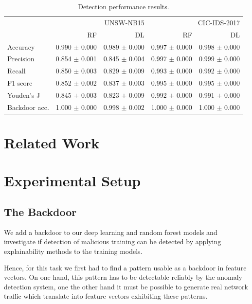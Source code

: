 \documentclass[10pt,sigconf,letterpaper,dvipsnames]{acmart}
\begin{document}
\begin{table}[h]
\caption{Detection performance results.} \label{tab:performance_results}
\begin{tabular}{l r r r r} \toprule
& \multicolumn{2}{r}{UNSW-NB15} & \multicolumn{2}{r}{CIC-IDS-2017} \\
& RF & DL & RF & DL \\ \midrule
Accuracy	& 0.990 $\pm$ 0.000	& 0.989 $\pm$ 0.000	& 0.997 $\pm$ 0.000	& 0.998 $\pm$ 0.000	\\
Precision	& 0.854 $\pm$ 0.001	& 0.845 $\pm$ 0.004	& 0.997 $\pm$ 0.000	& 0.999 $\pm$ 0.000	\\
Recall	& 0.850 $\pm$ 0.003	& 0.829 $\pm$ 0.009	& 0.993 $\pm$ 0.000	& 0.992 $\pm$ 0.000	\\
F1 score	& 0.852 $\pm$ 0.002	& 0.837 $\pm$ 0.003	& 0.995 $\pm$ 0.000	& 0.995 $\pm$ 0.000	\\
Youden's J	& 0.845 $\pm$ 0.003	& 0.823 $\pm$ 0.009	& 0.992 $\pm$ 0.000	& 0.991 $\pm$ 0.000	\\
Backdoor acc.	& 1.000 $\pm$ 0.000	& 0.998 $\pm$ 0.002	& 1.000 $\pm$ 0.000	& 1.000 $\pm$ 0.000	\\


\bottomrule
\end{tabular}
\end{table}

\section{Related Work}

\section{Experimental Setup} \label{sec:ml_approaches}
\subsection{The Backdoor}

We add a backdoor to our deep learning and random forest models and investigate if detection of malicious training can be detected by applying explainability methods to the training models.

Hence, for this task we first had to find a pattern usable as a backdoor in feature vectors. On one hand, this pattern has to be detectable reliably by the anomaly detection system, one the other hand it must be possible to generate real network traffic which translate into feature vectors exhibiting these patterns.
\end{document}
